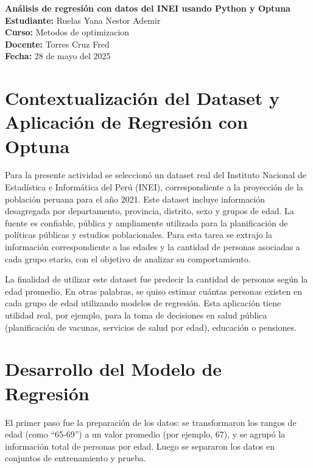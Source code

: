 \documentclass[a4paper,10pt]{article}
\begin{document}
\thispagestyle{fancy}

\begin{center}
    \textbf{\LARGE Análisis de regresión con datos del INEI usando Python y Optuna} \\
    \vspace{0.3cm}
    \textbf{Estudiante:} Ruelas Yana Nestor Ademir \\
    \textbf{Curso:} Metodos de optimizacion \\
    \textbf{Docente:} Torres Cruz Fred \\
    \textbf{Fecha:} 28 de mayo del 2025
\end{center}

\vspace{0.5cm}

\section*{Contextualización del Dataset y Aplicación de Regresión con Optuna}

Para la presente actividad se seleccionó un dataset real del Instituto Nacional de Estadística e Informática del Perú (INEI), correspondiente a la proyección de la población peruana para el año 2021. Este dataset incluye información desagregada por departamento, provincia, distrito, sexo y grupos de edad. La fuente es confiable, pública y ampliamente utilizada para la planificación de políticas públicas y estudios poblacionales. Para esta tarea se extrajo la información correspondiente a las edades y la cantidad de personas asociadas a cada grupo etario, con el objetivo de analizar su comportamiento.

La finalidad de utilizar este dataset fue predecir la cantidad de personas según la edad promedio. En otras palabras, se quiso estimar cuántas personas existen en cada grupo de edad utilizando modelos de regresión. Esta aplicación tiene utilidad real, por ejemplo, para la toma de decisiones en salud pública (planificación de vacunas, servicios de salud por edad), educación o pensiones.

\section*{Desarrollo del Modelo de Regresión}

El primer paso fue la preparación de los datos: se transformaron los rangos de edad (como ``65-69'') a un valor promedio (por ejemplo, 67), y se agrupó la información total de personas por edad. Luego se separaron los datos en conjuntos de entrenamiento y prueba.
\end{document}
